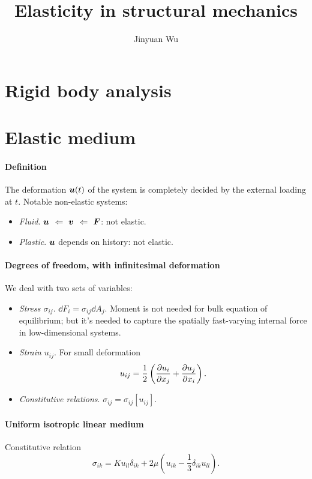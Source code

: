 \documentclass[hyperref, a4paper]{article}
\title{Elasticity in structural mechanics}
\author{Jinyuan Wu}
\begin{document}
\maketitle

\section{Rigid body analysis}

\section{Elastic medium}

\paragraph*{Definition} The deformation $\vb*{u}(t)$ of the system 
is completely decided by the external loading at $t$.
Notable non-elastic systems:
\begin{itemize}
    \item \emph{Fluid}. $\vb*{u}$ $\Leftarrow$ $\vb*{v}$ $\Leftarrow$ $\vb*{F}$: not elastic.
    \item \emph{Plastic}. $\vb*{u}$ depends on history: not elastic.
\end{itemize}

\paragraph*{Degrees of freedom, with infinitesimal deformation} We deal with two sets of variables:
\begin{itemize}
    \item \emph{Stress $\sigma_{ij}$}. $\dd{F}_i = \sigma_{ij} \dd{A}_j$.
    Moment is not needed for bulk equation of equilibrium; 
    but it's needed to capture the spatially fast-varying internal force 
    in low-dimensional systems.
    \item \emph{Strain $u_{ij}$}. For small deformation
    \begin{equation}
        u_{ij} = \frac{1}{2} \left(
            \pdv{u_i}{x_j} + \pdv{u_j}{x_i}
        \right).
    \end{equation}
    \item \emph{Constitutive relations}. $\sigma_{ij} = \sigma_{ij}[u_{ij}]$.
\end{itemize}

\paragraph*{Uniform isotropic linear medium} Constitutive relation  
\begin{equation}
    \sigma_{ik} = K u_{ll} \delta_{ik}
    + 2 \mu \left(
        u_{ik} - \frac{1}{3} \delta_{ik} u_{ll}
    \right).
    \label{eq:constitutive-relation}
\end{equation}
\end{document}
